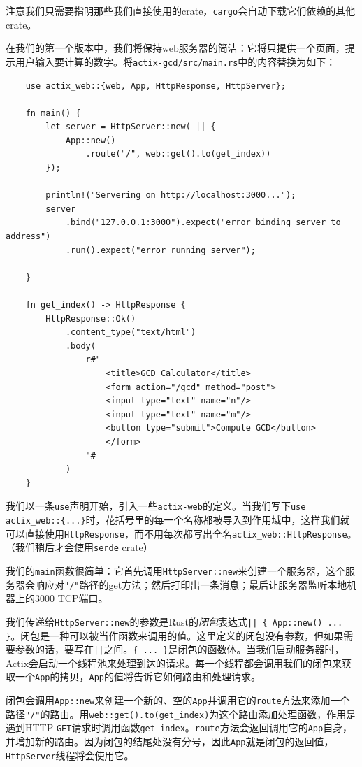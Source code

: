 注意我们只需要指明那些我们直接使用的crate，\texttt{cargo}会自动下载它们依赖的其他crate。

在我们的第一个版本中，我们将保持web服务器的简洁：它将只提供一个页面，提示用户输入要计算的数字。将\texttt{actix-gcd/src/main.rs}中的内容替换为如下：
\begin{verbatim}
    use actix_web::{web, App, HttpResponse, HttpServer};

    fn main() {
        let server = HttpServer::new( || {
            App::new()
                .route("/", web::get().to(get_index))
        });

        println!("Servering on http://localhost:3000...");
        server
            .bind("127.0.0.1:3000").expect("error binding server to     address")
            .run().expect("error running server");

    }

    fn get_index() -> HttpResponse {
        HttpResponse::Ok()
            .content_type("text/html")
            .body(
                r#"
                    <title>GCD Calculator</title>
                    <form action="/gcd" method="post">
                    <input type="text" name="n"/>
                    <input type="text" name="m"/>
                    <button type="submit">Compute GCD</button>
                    </form>
                "#
            )
    }
\end{verbatim}

我们以一条\texttt{use}声明开始，引入一些\texttt{actix-web}的定义。当我们写下\texttt{use actix\_web::\{...\}}时，花括号里的每一个名称都被导入到作用域中，这样我们就可以直接使用\texttt{HttpResponse}，而不用每次都写出全名\texttt{actix\_web::HttpResponse}。（我们稍后才会使用\texttt{serde} crate）

我们的\texttt{main}函数很简单：它首先调用\texttt{HttpServer::new}来创建一个服务器，这个服务器会响应对\texttt{"/"}路径的get方法；然后打印出一条消息；最后让服务器监听本地机器上的3000 TCP端口。

我们传递给\texttt{HttpServer::new}的参数是Rust的\emph{闭包}表达式\texttt{|| \{ App::new() ... \}}。闭包是一种可以被当作函数来调用的值。这里定义的闭包没有参数，但如果需要参数的话，要写在\texttt{||}之间。\texttt{\{ ... \}}是闭包的函数体。当我们启动服务器时，Actix会启动一个线程池来处理到达的请求。每一个线程都会调用我们的闭包来获取一个\texttt{App}的拷贝，\texttt{App}的值将告诉它如何路由和处理请求。

闭包会调用\texttt{App::new}来创建一个新的、空的\texttt{App}并调用它的\texttt{route}方法来添加一个路径\texttt{"/"}的路由。用\texttt{web::get().to(get\_index)}为这个路由添加处理函数，作用是遇到HTTP \texttt{GET}请求时调用函数\texttt{get\_index}。\texttt{route}方法会返回调用它的\texttt{App}自身，并增加新的路由。因为闭包的结尾处没有分号，因此\texttt{App}就是闭包的返回值，\texttt{HttpServer}线程将会使用它。

